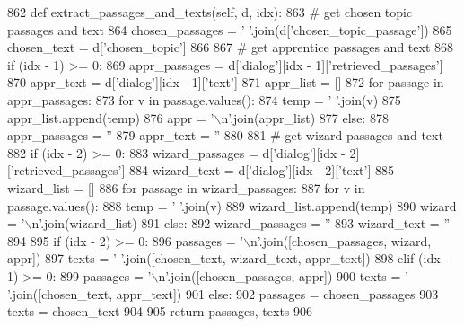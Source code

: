 \begin{DoxyCode}
862     \textcolor{keyword}{def }extract\_passages\_and\_texts(self, d, idx):
863         \textcolor{comment}{# get chosen topic passages and text}
864         chosen\_passages = \textcolor{stringliteral}{' '}.join(d[\textcolor{stringliteral}{'chosen\_topic\_passage'}])
865         chosen\_text = d[\textcolor{stringliteral}{'chosen\_topic'}]
866 
867         \textcolor{comment}{# get apprentice passages and text}
868         \textcolor{keywordflow}{if} (idx - 1) >= 0:
869             appr\_passages = d[\textcolor{stringliteral}{'dialog'}][idx - 1][\textcolor{stringliteral}{'retrieved\_passages'}]
870             appr\_text = d[\textcolor{stringliteral}{'dialog'}][idx - 1][\textcolor{stringliteral}{'text'}]
871             appr\_list = []
872             \textcolor{keywordflow}{for} passage \textcolor{keywordflow}{in} appr\_passages:
873                 \textcolor{keywordflow}{for} v \textcolor{keywordflow}{in} passage.values():
874                     temp = \textcolor{stringliteral}{' '}.join(v)
875                     appr\_list.append(temp)
876             appr = \textcolor{stringliteral}{'\(\backslash\)n'}.join(appr\_list)
877         \textcolor{keywordflow}{else}:
878             appr\_passages = \textcolor{stringliteral}{''}
879             appr\_text = \textcolor{stringliteral}{''}
880 
881         \textcolor{comment}{# get wizard passages and text}
882         \textcolor{keywordflow}{if} (idx - 2) >= 0:
883             wizard\_passages = d[\textcolor{stringliteral}{'dialog'}][idx - 2][\textcolor{stringliteral}{'retrieved\_passages'}]
884             wizard\_text = d[\textcolor{stringliteral}{'dialog'}][idx - 2][\textcolor{stringliteral}{'text'}]
885             wizard\_list = []
886             \textcolor{keywordflow}{for} passage \textcolor{keywordflow}{in} wizard\_passages:
887                 \textcolor{keywordflow}{for} v \textcolor{keywordflow}{in} passage.values():
888                     temp = \textcolor{stringliteral}{' '}.join(v)
889                     wizard\_list.append(temp)
890             wizard = \textcolor{stringliteral}{'\(\backslash\)n'}.join(wizard\_list)
891         \textcolor{keywordflow}{else}:
892             wizard\_passages = \textcolor{stringliteral}{''}
893             wizard\_text = \textcolor{stringliteral}{''}
894 
895         \textcolor{keywordflow}{if} (idx - 2) >= 0:
896             passages = \textcolor{stringliteral}{'\(\backslash\)n'}.join([chosen\_passages, wizard, appr])
897             texts = \textcolor{stringliteral}{' '}.join([chosen\_text, wizard\_text, appr\_text])
898         \textcolor{keywordflow}{elif} (idx - 1) >= 0:
899             passages = \textcolor{stringliteral}{'\(\backslash\)n'}.join([chosen\_passages, appr])
900             texts = \textcolor{stringliteral}{' '}.join([chosen\_text, appr\_text])
901         \textcolor{keywordflow}{else}:
902             passages = chosen\_passages
903             texts = chosen\_text
904 
905         \textcolor{keywordflow}{return} passages, texts
906 
\end{DoxyCode}
